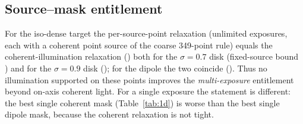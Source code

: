 \documentclass[11pt,a4paper]{article}
\newcommand{\SI}[2]{\ensuremath{#1\,\mathrm{#2}}}\newcommand{\SIrange}[3]{\ensuremath{#1\text{--}#2\,\mathrm{#3}}}
\theoremstyle{remark}\newtheorem*{remark}{Remark}
\begin{document}
\begin{table}[tbp]\centering\small
\caption{Certified real-mask (PSM) and nonnegative-mask optima versus a pattern-error ILT (DUV, conventional $\sigma=0.7$ disk, $\tau=\SI{5}{nm}$). All entries are ratios $\rho$ (lower is better). $L_R$: exactly verified PSM certificate; $U_R$: best feasible PSM mask; $L_+$: exactly verified DNN certificate for nonnegative pixel-integrated masks on a \SI{5}{nm} grid; $U_+$: best feasible nonnegative pixel-integrated mask; penalty bracket: $[L_+/U_R-1,\ U_+/L_R-1]$, a certified interval for $\rho^\star_+/\rho^\star_R-1$; ILT (PSM): ratio reached by the pattern-error ILT mask and its suboptimality bracket $[\rho_{\mathrm{ILT}}/U_R-1,\ \rho_{\mathrm{ILT}}/L_R-1]$.}\label{tab:psm}
\end{table}

\subsection{Source--mask entitlement}
For the iso-dense target the per-source-point relaxation (unlimited exposures, each with a coherent point source of the coarse 349-point rule) equals the coherent-illumination relaxation (\smoCoh) both for the $\sigma=0.7$ disk (fixed-source bound \smoConvFixed) and for the $\sigma=0.9$ disk (\smoNineFixed); for the dipole the two coincide (\smoDipFixed). Thus no illumination supported on these points improves the \emph{multi-exposure} entitlement beyond on-axis coherent light. For a single exposure the statement is different: the best single coherent mask (Table~\ref{tab:1d}) is worse than the best single dipole mask, because the coherent relaxation is not tight.
\end{document}
